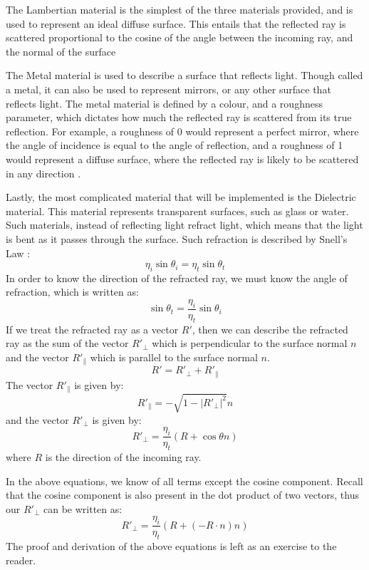 \documentclass[../main.tex]{subfiles}
\begin{document}
The Lambertian material is the simplest of the three materials provided, and is used to represent an ideal diffuse surface. This entails that the reflected 
ray is scattered proportional to the cosine of the angle between the incoming ray, and the normal of the surface \cite{peter_shirley_trevor_david_black_steve_hollasch_ray_nodate}

The Metal material is used to describe a surface that reflects light. Though called a metal, it can also be used to represent mirrors, or any other surface that reflects light.
The metal material is defined by a colour, and a roughness parameter, which dictates how much the reflected ray is scattered from its true reflection.
For example, a roughness of 0 would represent a perfect mirror, where the angle of incidence is equal to the angle of reflection, and a roughness of 1 would represent a diffuse surface,
where the reflected ray is likely to be scattered in any direction \cite{peter_shirley_trevor_david_black_steve_hollasch_ray_nodate, pharr_physically_2016}.

Lastly, the most complicated material that will be implemented is the Dielectric material. This material represents transparent surfaces, such as glass or water.
Such materials, instead of reflecting light refract light, which means that the light is bent as it passes through the surface.
Such refraction is described by Snell's Law \cite{bone_level_2016}:
$$
\eta_i \sin \theta_i = \eta_t \sin \theta_t
$$
In order to know the direction of the refracted ray, we must know the angle of refraction, which is written as:
$$
\sin \theta_t = \frac{\eta_i}{\eta_t} \sin \theta_i
$$
If we treat the refracted ray as a vector $R'$, then we can describe the refracted ray as the sum of the
vector $R'_{\perp}$ which is perpendicular to the surface normal $n$ and the vector $R'_{\parallel}$ which is parallel to the surface normal $n$.
$$
R' = R'_{\perp} + R'_{\parallel}
$$
The vector $R'_{\parallel}$ is given by:
$$
R'_{\parallel} = -\sqrt{1 - |R'_{\perp}|^2} n
$$
and the vector $R'_{\perp}$ is given by:
$$
R'_{\perp} = \frac{\eta_i}{\eta_t} (R + \cos \theta n)
$$
where $R$ is the direction of the incoming ray.

In the above equations, we know of all terms except the cosine component. Recall that the cosine component is also present
in the dot product of two vectors, thus our $R'_{\perp}$ can be written as:
$$
R'_{\perp} = \frac{\eta_i}{\eta_t} (R + (-R \cdot n) n)
$$
The proof and derivation of the above equations is left as an exercise to the reader.
\end{document}
